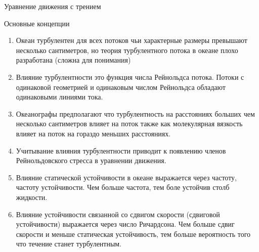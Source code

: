 \begin{chapter}{Уравнение движения с трением}
\begin{section}{Основные концепции}
\begin{enumerate}
\item
Океан турбулентен для всех потоков чьи характерные размеры превышают
несколько сантиметров, но теория турбулентного потока в океане плохо
разработана (сложна для понимания)
%

\item
Влияние турбулентности это функция числа Рейнольдса потока. Потоки с
одинаковой геометрией и одинаковым числом Рейнольдса обладают
одинаковыми линиями тока. 
%

\item
Океанографы предполагают что турбулентность на расстояниях больших чем
несколько сантиметров влияет на поток также как молекулярная вязкость
влияет на поток на гораздо меньших расстояниях.

\item
Учитывание влияния турбулентности приводит к появлению членов
Рейнольдовского стресса в уравнении движения.

\item
Влияние статической устойчивости в океане выражается через частоту,
частоту устойчивости. Чем больше частота, тем боле устойчив столб
жидкости.

\item
Влияние устойчивости связанной со сдвигом скорости (сдвиговой
устойчивости) выражается через число Ричардсона. Чем больше сдвиг
скорости и меньше статическая устойчивость, тем больше вероятность
того что течение станет турбулентным.


\end{enumerate}
\end{section}
\end{chapter}
